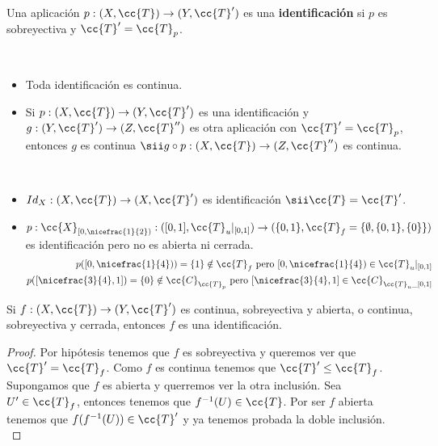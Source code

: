 \begin{definicion}
    Una aplicación $p:(X, \cc{T})\to (Y, \cc{T}')$ es una \textbf{identificación} si $p$ es sobreyectiva y $\cc{T}'=\cc{T}_p$.
    \endsquare
\end{definicion}

\begin{observacion}\
    \begin{itemize}
        \item Toda identificación es continua.
        \item Si $p:(X, \cc{T})\to (Y, \cc{T}')$ es una identificación y $g:(Y, \cc{T}')\to(Z, \cc{T}'')$ es otra aplicación con $\cc{T}'=\cc{T}_p$, entonces $g$ es continua $\sii g\circ p: (X, \cc{T})\to (Z, \cc{T}'')$ es continua.
    \end{itemize}
\end{observacion}

\begin{ejemplo}\
    \begin{itemize}
        \item $Id_X:(X, \cc{T})\to (X, \cc{T}')$ es identificación $\sii \cc{T}=\cc{T}'$.
        \item $p: \cc{X}_{[0,\nicefrac{1}{2})}:([0,1], \cc{T}_u|_{[0,1]})\to (\{0,1\}, \cc{T}_f=\{\emptyset, \{0,1\}, \{0\}\})$ es identificación pero no es abierta ni cerrada.
        \begin{align*}
            p([0,\nicefrac{1}{4})) = \{1\}\notin \cc{T}_f \text{ pero } [0,\nicefrac{1}{4})\in \cc{T}_u|_{[0,1]}\\
            p([\nicefrac{3}{4}, 1])=\{0\}\notin \cc{C}_{\cc{T}_p} \text{ pero } [\nicefrac{3}{4}, 1] \in \cc{C}_{\cc{T}_u\_{[0,1]}}
        \end{align*}
    \end{itemize}
    \endsquare
\end{ejemplo}

\begin{prop}
    Si $f:(X, \cc{T})\to (Y, \cc{T}')$ es continua, sobreyectiva y abierta, o continua, sobreyectiva y cerrada, entonces $f$ es una identificación.
    \begin{proof}
        Por hipótesis tenemos que $f$ es sobreyectiva y queremos ver que $\cc{T}'=\cc{T}_f$. Como $f$ es continua tenemos que $\cc{T}'\leq \cc{T}_f$. Supongamos que $f$ es abierta y querremos ver la otra inclusión. Sea $U'\in \cc{T}_f$, entonces tenemos que $f^{-1}(U)\in \cc{T}$. Por ser $f$ abierta tenemos que $f(f^{-1}(U))\in \cc{T}'$ y ya tenemos probada la doble inclusión.\\

    \end{proof}
\end{prop}


